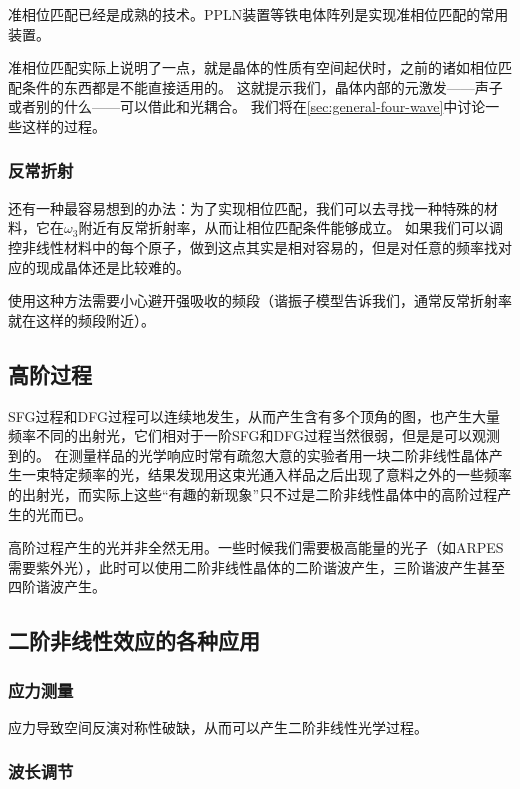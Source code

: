 准相位匹配已经是成熟的技术。PPLN装置等铁电体阵列是实现准相位匹配的常用装置。

准相位匹配实际上说明了一点，就是晶体的性质有空间起伏时，之前的诸如相位匹配条件的东西都是不能直接适用的。
这就提示我们，晶体内部的元激发——声子或者别的什么——可以借此和光耦合。
我们将在\autoref{sec:general-four-wave}中讨论一些这样的过程。

\subsubsection{反常折射}

还有一种最容易想到的办法：为了实现相位匹配，我们可以去寻找一种特殊的材料，它在$\omega_3$附近有反常折射率，从而让相位匹配条件能够成立。
如果我们可以调控非线性材料中的每个原子，做到这点其实是相对容易的，但是对任意的频率找对应的现成晶体还是比较难的。

使用这种方法需要小心避开强吸收的频段（谐振子模型告诉我们，通常反常折射率就在这样的频段附近）。

\subsection{高阶过程}

SFG过程和DFG过程可以连续地发生，从而产生含有多个顶角的图，也产生大量频率不同的出射光，它们相对于一阶SFG和DFG过程当然很弱，但是是可以观测到的。
在测量样品的光学响应时常有疏忽大意的实验者用一块二阶非线性晶体产生一束特定频率的光，结果发现用这束光通入样品之后出现了意料之外的一些频率的出射光，而实际上这些“有趣的新现象”只不过是二阶非线性晶体中的高阶过程产生的光而已。

高阶过程产生的光并非全然无用。一些时候我们需要极高能量的光子（如ARPES需要紫外光），此时可以使用二阶非线性晶体的二阶谐波产生，三阶谐波产生甚至四阶谐波产生。

\subsection{二阶非线性效应的各种应用}

\subsubsection{应力测量}

应力导致空间反演对称性破缺，从而可以产生二阶非线性光学过程。

\subsubsection{波长调节}

